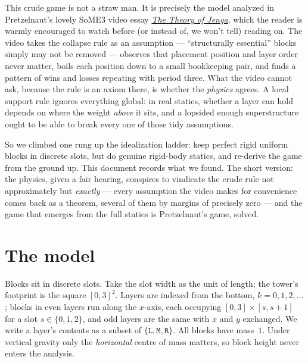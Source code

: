 \documentclass[11pt]{article}
\theoremstyle{definition}
\theoremstyle{remark}
\newcommand{\layer}[1]{\texttt{#1}}
\begin{document}
This crude game is not a straw man. It is precisely the model analyzed in
Pretzelnaut's lovely SoME3 video essay
\href{https://www.youtube.com/watch?v=wrSEfX82WbE}{\emph{The Theory of
Jenga}}, which the reader is warmly encouraged to watch before (or instead
of, we won't tell) reading on. The video takes the collapse rule as an
assumption --- ``structurally essential'' blocks simply may not be removed
--- observes that placement position and layer order never matter, boils
each position down to a small bookkeeping pair, and finds a pattern of
wins and losses repeating with period three. What the video cannot ask,
because the rule is an axiom there, is whether the \emph{physics} agrees.
A local support rule ignores everything global: in real statics, whether a
layer can hold depends on where the weight \emph{above} it sits, and a
lopsided enough superstructure ought to be able to break every one of
those tidy assumptions.

So we climbed one rung up the idealization ladder: keep perfect rigid
uniform blocks in discrete slots, but do genuine rigid-body statics, and
re-derive the game from the ground up. This document records what we
found. The short version: the physics, given a fair hearing, conspires to
vindicate the crude rule not approximately but \emph{exactly} --- every
assumption the video makes for convenience comes back as a theorem, several
of them by margins of precisely zero --- and the game that emerges from the
full statics is Pretzelnaut's game, solved.

\section{The model}

Blocks sit in discrete slots. Take the slot width as the unit of length; the
tower's footprint is the square $[0,3]^2$. Layers are indexed from the
bottom, $k = 0, 1, 2, \dots$; blocks in even layers run along the $x$-axis,
each occupying $[0,3]\times[s,s+1]$ for a slot $s \in \{0,1,2\}$, and odd
layers are the same with $x$ and $y$ exchanged. We write a layer's contents
as a subset of $\{\layer{L},\layer{M},\layer{R}\}$. All blocks have mass~$1$.
Under vertical gravity only the \emph{horizontal} centre of mass matters,
so block height never enters the analysis.
\end{document}
